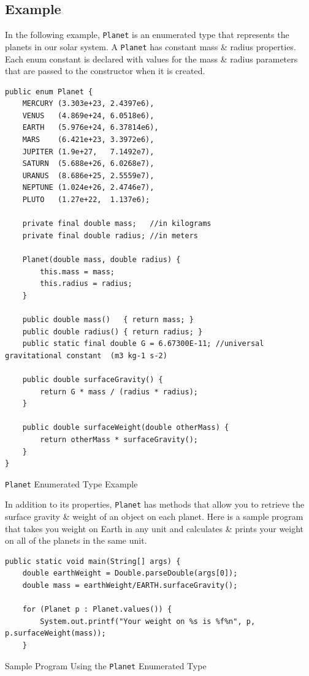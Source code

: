 \documentclass[a4paper,11pt]{article}
\newenvironment{code}{\captionsetup{type=listing}}{}
\begin{document}
\subsection{Example}
In the following example, \verb|Planet| is an enumerated type that represents the planets in our solar system.
A \verb|Planet| has constant mass \& radius properties. 
Each enum constant is declared with values for the mass \& radius parameters that are passed to the constructor when it is 
created. 
\begin{code}
\begin{verbatim}
public enum Planet {
    MERCURY (3.303e+23, 2.4397e6),
    VENUS   (4.869e+24, 6.0518e6),
    EARTH   (5.976e+24, 6.37814e6),
    MARS    (6.421e+23, 3.3972e6),
    JUPITER (1.9e+27,   7.1492e7),
    SATURN  (5.688e+26, 6.0268e7),
    URANUS  (8.686e+25, 2.5559e7),
    NEPTUNE (1.024e+26, 2.4746e7),
    PLUTO   (1.27e+22,  1.137e6);

    private final double mass;   //in kilograms
    private final double radius; //in meters

    Planet(double mass, double radius) {
        this.mass = mass;
        this.radius = radius;
    }

    public double mass()   { return mass; }
    public double radius() { return radius; }
    public static final double G = 6.67300E-11; //universal gravitational constant  (m3 kg-1 s-2)

    public double surfaceGravity() {
        return G * mass / (radius * radius);
    }

    public double surfaceWeight(double otherMass) {
        return otherMass * surfaceGravity();
    }
}
\end{verbatim}
\caption{\texttt{Planet} Enumerated Type Example}
\end{code}

In addition to its properties, \verb|Planet| has methods that allow you to retrieve the surface gravity \& weight of an
object on each planet. 
Here is a sample program that takes you weight on Earth in any unit and calculates \& prints your weight on all of the 
planets in the same unit.
\begin{code}
\begin{verbatim}
public static void main(String[] args) {
    double earthWeight = Double.parseDouble(args[0]);
    double mass = earthWeight/EARTH.surfaceGravity();

    for (Planet p : Planet.values()) {
        System.out.printf("Your weight on %s is %f%n", p, p.surfaceWeight(mass));
    }
\end{verbatim}
\caption{Sample Program Using the \texttt{Planet} Enumerated Type}
\end{code}
\end{document}
